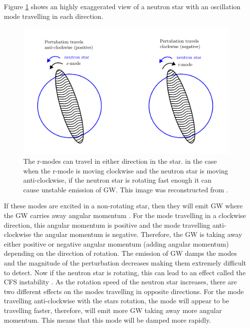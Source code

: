 \if
Figure \ref{intro:source:cw:rmode} shows an highly exaggerated view of a neutron star with an oscillation mode travelling in each direction.
\begin{figure}[h]
	\centering
	\includegraphics[width=\textwidth]{C1_intro/rmode.pdf}
	\caption[Generating \glspl{GW} from r-modes in neutron stars.]{The r-modes can travel in either direction in the star. in the case when the r-mode is moving clockwise and the neutron star is moving anti-clockwise, if the neutron star is rotating fast enough it can cause unstable emission of \gls{GW}. This image was reconstructed from \citep{jonesCFSInstability}.}
	\label{intro:source:cw:rmode}
\end{figure}
If these modes are excited in a non-rotating star, then they will emit \gls{GW} where the \gls{GW}  carries away angular momentum \citep{jonesCFSInstability}. 
For the mode travelling in a clockwise direction, this angular momentum is positive and the mode travelling anti-clockwise the angular momentum is negative. 
Therefore, the \gls{GW} is taking away either positive or negative angular momentum (adding angular momentum) depending on the direction of rotation.
The emission of \gls{GW} damps the modes and the magnitude of the perturbation decreases making them extremely difficult to detect.
Now if the neutron star is rotating, this can lead to an effect called the \gls{CFS} instability  \citep{chandrasekhar1970SolutionsTwo,friedman1978SecularInstability}. 
As the rotation speed of the neutron star increases, there are two different effects on the modes travelling in opposite directions. 
For the mode travelling anti-clockwise with the stars rotation, the mode will appear to be travelling faster, therefore, will emit more \gls{GW} taking away more angular momentum. This means that this mode will be damped more rapidly.
